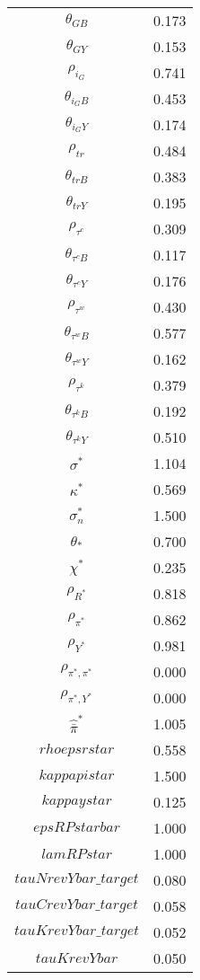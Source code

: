 \begin{center}
\begin{longtable}{cc}
$\theta_{GB}$ 	 & 	 0.173 \\
$\theta_{GY}$ 	 & 	 0.153 \\
$\rho_{i_G}$ 	 & 	 0.741 \\
$\theta_{i_GB}$ 	 & 	 0.453 \\
$\theta_{i_GY}$ 	 & 	 0.174 \\
$\rho_{tr}$ 	 & 	 0.484 \\
$\theta_{trB}$ 	 & 	 0.383 \\
$\theta_{trY}$ 	 & 	 0.195 \\
$\rho_{\tau^c}$ 	 & 	 0.309 \\
$\theta_{\tau^cB}$ 	 & 	 0.117 \\
$\theta_{\tau^cY}$ 	 & 	 0.176 \\
$\rho_{\tau^w}$ 	 & 	 0.430 \\
$\theta_{\tau^wB}$ 	 & 	 0.577 \\
$\theta_{\tau^wY}$ 	 & 	 0.162 \\
$\rho_{\tau^k}$ 	 & 	 0.379 \\
$\theta_{\tau^kB}$ 	 & 	 0.192 \\
$\theta_{\tau^kY}$ 	 & 	 0.510 \\
$\sigma^*$ 	 & 	 1.104 \\
$\kappa^*$ 	 & 	 0.569 \\
$\sigma^*_n$ 	 & 	 1.500 \\
$\theta_*$ 	 & 	 0.700 \\
$\chi^*$ 	 & 	 0.235 \\
${\rho_{R^*}}$ 	 & 	 0.818 \\
${\rho_{\pi^*}}$ 	 & 	 0.862 \\
${\rho_{Y^*}}$ 	 & 	 0.981 \\
${\rho_{\pi^*,\pi^*}}$ 	 & 	 0.000 \\
${\rho_{\pi^*,Y^*}}$ 	 & 	 0.000 \\
$\hat{\bar{\pi}}^*$ 	 & 	 1.005 \\
$rhoepsrstar$ 	 & 	 0.558 \\
$kappapistar$ 	 & 	 1.500 \\
$kappaystar$ 	 & 	 0.125 \\
$epsRPstarbar$ 	 & 	 1.000 \\
$lamRPstar$ 	 & 	 1.000 \\
$tauNrevYbar\_target$ 	 & 	 0.080 \\
$tauCrevYbar\_target$ 	 & 	 0.058 \\
$tauKrevYbar\_target$ 	 & 	 0.052 \\
$tauKrevYbar$ 	 & 	 0.050 \\

\end{longtable}
\end{center}
